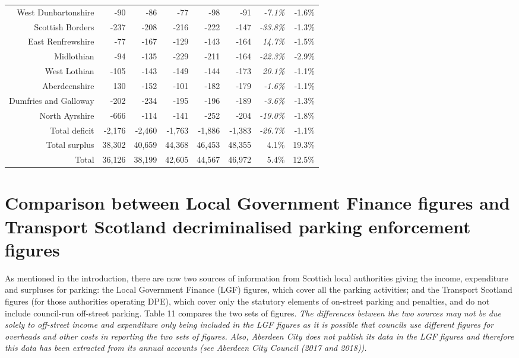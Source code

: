 \documentclass[
  12pt,
]{article}
\begin{document}
\begin{longtable}[t]{rrrrrrrr}
West Dunbartonshire & -90 & -86 & -77 & -98 & -91 & \em{ -7.1\%} & -1.6\%\\
Scottish Borders & -237 & -208 & -216 & -222 & -147 & \em{-33.8\%} & -1.3\%\\
East Renfrewshire & -77 & -167 & -129 & -143 & -164 & \em{ 14.7\%} & -1.5\%\\
Midlothian & -94 & -135 & -229 & -211 & -164 & \em{-22.3\%} & -2.9\%\\
West Lothian & -105 & -143 & -149 & -144 & -173 & \em{ 20.1\%} & -1.1\%\\
Aberdeenshire & 130 & -152 & -101 & -182 & -179 & \em{ -1.6\%} & -1.1\%\\
Dumfries and Galloway & -202 & -234 & -195 & -196 & -189 & \em{ -3.6\%} & -1.3\%\\
North Ayrshire & -666 & -114 & -141 & -252 & -204 & \em{-19.0\%} & -1.8\%\\
\midrule
Total deficit & -2,176 & -2,460 & -1,763 & -1,886 & -1,383 & \em{-26.7\%} & -1.1\%\\
Total surplus & 38,302 & 40,659 & 44,368 & 46,453 & 48,355 & 4.1\% & 19.3\%\\
\midrule
Total & 36,126 & 38,199 & 42,605 & 44,567 & 46,972 & 5.4\% & 12.5\%\\*
\end{longtable}
\endgroup{}

\newpage

\hypertarget{comparison-between-local-government-finance-figures-and-transport-scotland-decriminalised-parking-enforcement-figures}{%
\section{Comparison between Local Government Finance figures and Transport Scotland decriminalised parking enforcement figures}\label{comparison-between-local-government-finance-figures-and-transport-scotland-decriminalised-parking-enforcement-figures}}

As mentioned in the introduction, there are now two sources of information from Scottish local authorities giving the income, expenditure and surpluses for parking: the Local Government Finance (LGF) figures, which cover all the parking activities; and the Transport Scotland figures (for those authorities operating DPE), which cover only the statutory elements of on-street parking and penalties, and do not include council-run off-street parking. Table 11 compares the two sets of figures. \emph{The differences between the two sources may not be due solely to off-street income and expenditure only being included in the LGF figures as it is possible that councils use different figures for overheads and other costs in reporting the two sets of figures. Also, Aberdeen City does not publish its data in the LGF figures and therefore this data has been extracted from its annual accounts (see Aberdeen City Council (2017 and 2018)).}
\end{document}
